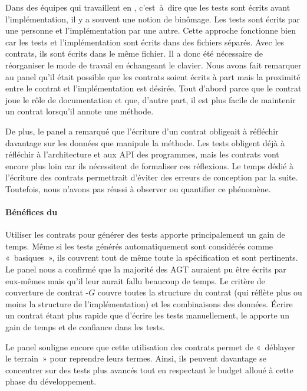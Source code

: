 Dans des équipes qui travaillent en ,
c'est~à~dire que les tests sont écrits avant l'implémentation, il y a souvent
une notion de binômage. Les tests sont écrits par une personne et
l'implémentation par une autre. Cette approche fonctionne bien car les tests et
l'implémentation sont écrits dans des fichiers séparés. Avec les contrats, ils
sont écrits dans le même fichier. Il a donc été nécessaire de réorganiser le
mode de travail en échangeant le clavier. Nous avons fait remarquer au panel
qu'il était possible que les contrats soient écrits à part mais la proximité
entre le contrat et l'implémentation est désirée. Tout d'abord parce que le
contrat joue le rôle de documentation et que, d'autre part, il est plus facile
de maintenir un contrat lorsqu'il annote une méthode.

De plus, le panel a remarqué que l'écriture d'un contrat obligeait à réfléchir
davantage sur les données que manipule la méthode. Les tests obligent déjà à
réfléchir à l'architecture et aux API des programmes, mais les contrats vont
encore plus loin car ils nécessitent de formaliser ces réflexions. Le temps
dédié à l'écriture des contrats permettrait d'éviter des erreurs de conception
par la suite. Toutefois, nous n'avons pas réussi à observer ou quantifier ce
phénomène.

\paragraph{Bénéfices du } Utiliser les
contrats pour générer des tests apporte principalement un gain de temps. Même si
les tests générés automatiquement sont considérés comme «~basiques~», ils
couvrent tout de même toute la spécification et sont pertinents. Le panel nous a
confirmé que la majorité des AGT auraient pu être écrits par eux-mêmes mais
qu'il leur aurait fallu beaucoup de temps. Le critère de couverture de contrat
-$G$ couvre toutes la structure du contrat (qui réflète plus ou
moins la structure de l'implémentation) et les combinaisons des données. Écrire
un contrat étant plus rapide que d'écrire les tests manuellement, le
 apporte un gain de temps et de confiance dans
les tests.

Le panel souligne encore que cette utilisation des contrats permet de «~déblayer
le terrain~» pour reprendre leurs termes. Ainsi, ils peuvent davantage se
concentrer sur des tests plus avancés tout en respectant le budget alloué à
cette phase du développement.

